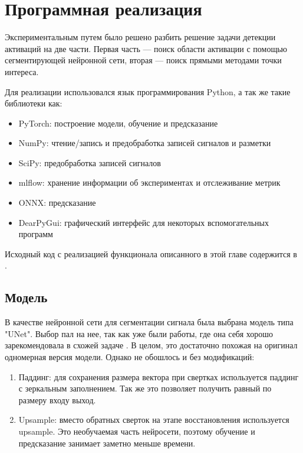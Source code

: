 \chapter{Программная реализация}

Экспериментальным путем было решено разбить решение задачи детекции активаций
на две части. Первая часть --- поиск области активации с помощью
сегментирующей нейронной сети, вторая --- поиск прямыми методами точки
интереса.

Для реализации использовался язык программирования Python, а так же такие библиотеки как:

\begin{itemize}
	\item PyTorch: построение модели, обучение и предсказание
	\item NumPy: чтение/запись и предобработка записей сигналов и разметки
	\item SciPy: предобработка записей сигналов
	\item mlflow: хранение информации об экспериментах и отслеживание метрик
	\item ONNX: предсказание
	\item DearPyGui: графический интерфейс для некоторых вспомогательных программ
\end{itemize}

\noindent Исходный код с реализацией функционала описанного в этой главе содержится
в \cite{heartbeat-detector-source,egm-analyzer-source}.

\section{Модель}

В качестве нейронной сети для сегментации сигнала была выбрана модель типа
"UNet". Выбор пал на нее, так как уже были работы, где она себя хорошо
зарекомендовала в схожей задаче \cite{victor}. В целом, это достаточно похожая
на оригинал одномерная версия модели. Однако не обошлось и без модификаций:

\begin{enumerate}

	\item Паддинг: для сохранения размера вектора при свертках используется
	паддинг с зеркальным заполнением. Так же это позволяет получить равный по
	размеру входу выход.

	\item Upsample: вместо обратных сверток на этапе восстановления
	используется upsample. Это необучаемая часть нейросети, поэтому обучение и
	предсказание занимает заметно меньше времени.

\end{enumerate}

